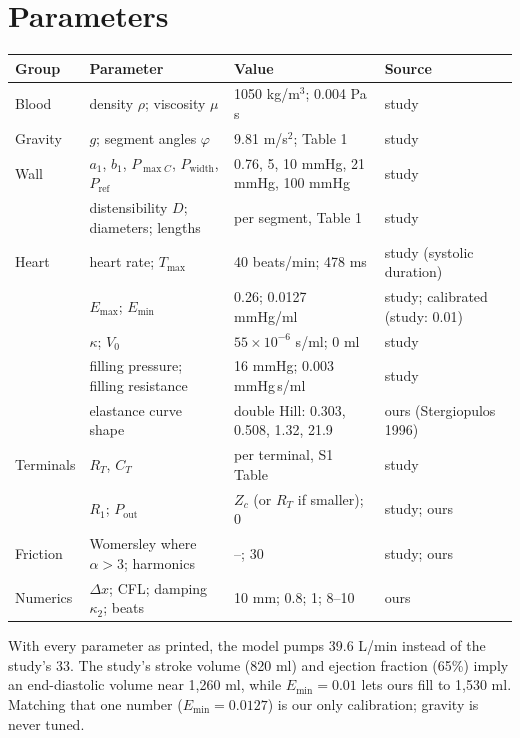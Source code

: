 \documentclass[10pt]{article}
\begin{document}
\section{Parameters}
\begin{center}
\small
\begin{tabularx}{\textwidth}{@{}lXll@{}}
\toprule
Group & Parameter & Value & Source \\
\midrule
Blood & density $\rho$; viscosity $\mu$ & 1050 kg/m$^3$; 0.004 Pa\,s & study \\
Gravity & $g$; segment angles $\varphi$ & 9.81 m/s$^2$; Table 1 & study \\
Wall & $a_1$, $b_1$, $P_{\max C}$, $P_{\mathrm{width}}$, $P_{\mathrm{ref}}$ & 0.76, 5, 10 mmHg, 21 mmHg, 100 mmHg & study \\
 & distensibility $D$; diameters; lengths & per segment, Table 1 & study \\
Heart & heart rate; $T_{\max}$ & 40 beats/min; 478 ms & study (systolic duration) \\
 & $E_{\max}$; $E_{\min}$ & 0.26; 0.0127 mmHg/ml & study; calibrated (study: 0.01) \\
 & $\kappa$; $V_0$ & $55\times10^{-6}$ s/ml; 0 ml & study \\
 & filling pressure; filling resistance & 16 mmHg; 0.003 mmHg\,s/ml & study \\
 & elastance curve shape & double Hill: 0.303, 0.508, 1.32, 21.9 & ours (Stergiopulos 1996) \\
Terminals & $R_T$, $C_T$ & per terminal, S1 Table & study \\
 & $R_1$; $P_{\mathrm{out}}$ & $Z_c$ (or $R_T$ if smaller); 0 & study; ours \\
Friction & Womersley where $\alpha>3$; harmonics & --; 30 & study; ours \\
Numerics & $\Delta x$; CFL; damping $\kappa_2$; beats & 10 mm; 0.8; 1; 8--10 & ours \\
\bottomrule
\end{tabularx}
\end{center}
With every parameter as printed, the model pumps 39.6 L/min instead of the study's 33. The study's stroke volume
(820 ml) and ejection fraction (65\%) imply an end-diastolic volume near 1{,}260 ml, while $E_{\min}=0.01$ lets ours
fill to 1{,}530 ml. Matching that one number ($E_{\min}=0.0127$) is our only calibration; gravity is never tuned.
\end{document}
